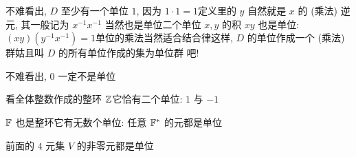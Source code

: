 \begin{remark}
    不难看出, $D$ 至少有一个单位 $1$, 因为 $1 \cdot 1 = 1$\period 定义里的 $y$ 自然就是 $x$ 的 (乘法) 逆元, 其一般记为 $x^{-1}$\period $x^{-1}$ 当然也是单位\period 二个单位 $x,y$ 的积 $xy$ 也是单位: $(xy)(y^{-1}x^{-1})=1$\period 单位的乘法当然适合结合律\period 这样, $D$ 的单位作成一个 (乘法) 群\period 姑且叫 $D$ 的所有单位作成的集为单位群  吧!
\end{remark}

\begin{remark}
    不难看出, $0$ 一定不是单位\period
\end{remark}

\begin{example}
    看全体整数作成的整环 $\mathbb{Z}$\period 它恰有二个单位: $1$ 与 $-1$\period
\end{example}

\begin{example}
    $\mathbb{F}$ 也是整环\period 它有无数个单位: 任意 $\mathbb{F}^{\ast}$ 的元都是单位\period
\end{example}

\begin{example}
    前面的 $4$ 元集 $V$ 的非零元都是单位\period
\end{example}

